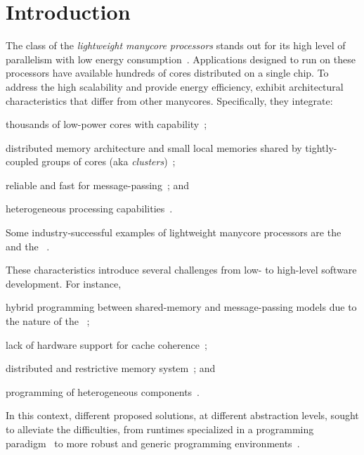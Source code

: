 \section{Introduction}
\label{sec:introduction}

	The class of the \textit{lightweight manycore processors} stands out for
	its high level of parallelism with low energy
	consumption~\cite{francesquini2015}. Applications designed to run on these
	processors have available hundreds of cores distributed on a single chip.
	To address the high scalability and provide energy efficiency, \lws exhibit
	architectural characteristics that differ from other manycores.
	Specifically, they integrate:
	\begin{enumerate*}[label=(\roman*)]
		\item thousands of low-power cores with \mimd capability~\cite{Rossi2017};
		\item distributed memory architecture and small local memories shared by
			tightly-coupled groups of cores (aka \textit{clusters})~\cite{Bohnenstiehl2017};
		\item reliable and fast \nocs for message-passing~\cite{Bohnenstiehl2017}; and
		\item heterogeneous processing capabilities~\cite{Davidson2018}.
	\end{enumerate*}
	Some industry-successful examples of lightweight manycore processors are
	the \mppa~\cite{DeDinechin2013-2} and the \epiphany~\cite{Olofsson2016}.

	These characteristics introduce several challenges from low- to high-level
	software development. For instance,
	\begin{enumerate*}[label=(\roman*)]
		\item hybrid programming between shared-memory and message-passing
			models due to the nature of the \lws~\cite{kelly2013};
		\item lack of hardware support for cache coherence~\cite{francesquini2015};
		\item distributed and restrictive memory system~\cite{Castro2016}; and
		\item programming of heterogeneous components~\cite{Barbalace2015}.
	\end{enumerate*}
	In this context, different proposed solutions, at different abstraction
	levels, sought to alleviate the difficulties, from runtimes specialized in
	a programming paradigm~\cite{Zhou:coroutine, Cesarini:task} to more robust
	and generic programming environments~\cite{Penna:Microkernel}.


